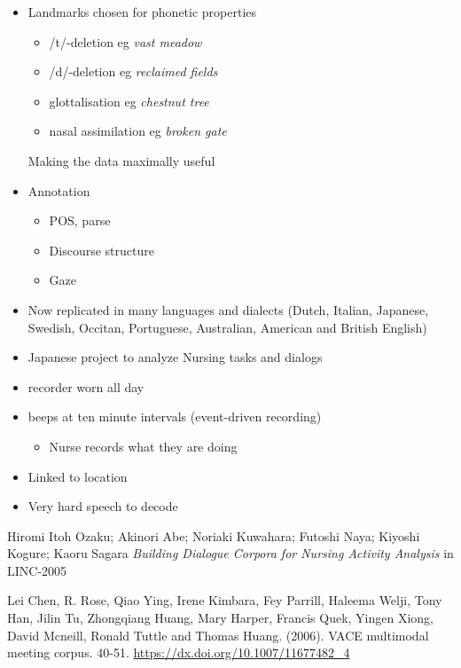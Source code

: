 \documentclass[a4paper,landscape,headrule,footrule,xetex]{foils}
\begin{document}
\begin{itemize}
\item Landmarks chosen for phonetic properties
  \begin{itemize}
\item /t/-deletion eg \textit{vast meadow}
\item /d/-deletion eg \textit{reclaimed fields}
\item glottalisation eg \textit{chestnut tree}
\item nasal assimilation eg \textit{broken gate }
\end{itemize}
Making the data maximally useful
\item Annotation
  \begin{itemize}
  \item POS, parse
  \item Discourse structure
  \item Gaze
  \end{itemize}
\item Now replicated in many languages and dialects (Dutch, Italian, Japanese, Swedish, Occitan, Portuguese, Australian, American and British English)
\end{itemize}

\begin{itemize}
\item Japanese project to analyze Nursing tasks and dialogs
\item recorder worn all day
\item beeps at ten minute intervals  (event-driven recording)
  \begin{itemize}
  \item Nurse records what they are doing
  \end{itemize}
\item Linked to location
\item Very hard speech to decode
\end{itemize}
Hiromi Itoh Ozaku; Akinori Abe; Noriaki Kuwahara; Futoshi Naya; Kiyoshi Kogure; Kaoru Sagara
\textit{Building Dialogue Corpora for Nursing Activity Analysis} in LINC-2005




Lei Chen, R. Rose, Qiao Ying, Irene Kimbara, Fey Parrill, Haleema
Welji, Tony Han, Jilin Tu, Zhongqiang Huang, Mary Harper,
Francis Quek, Yingen Xiong, David Mcneill,  Ronald Tuttle and
Thomas Huang. (2006). VACE multimodal meeting
corpus. 40-51. \url{https://dx.doi.org/10.1007/11677482_4}
\end{document}
